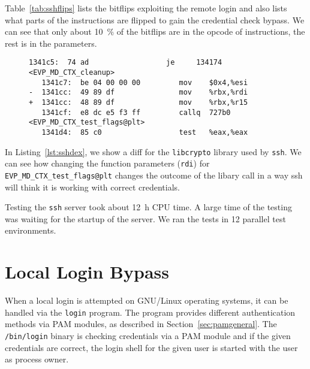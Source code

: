 Table~\ref{tab:sshflips} lists the bitflips exploiting the remote login and also
lists what parts of the instructions are flipped to gain the credential check
bypass. We can see that only about \SI{10}{\percent} of the bitflips are in the
opcode of instructions, the rest is in the parameters.

\begin{figure}
\begin{minipage}{\linewidth}
\begin{lstlisting}[style=diff,
                   caption={Diff for a bitflip applied to the
\texttt{libcrypto.so.1.0.2} binary in order to bypass a credential check. The
move from \texttt{rbx} to \texttt{rdi} is exchanged with a move to
\texttt{r15}, this changes the parameter for \texttt{EVP\_MD\_CTX\_test\_flags},
which is highly likely to result in a different outcome.},
label=lst:sshdex]
   1341c5:  74 ad                  je     134174 <EVP_MD_CTX_cleanup>
   1341c7:  be 04 00 00 00         mov    $0x4,%esi
-  1341cc:  49 89 df               mov    %rbx,%rdi
+  1341cc:  48 89 df               mov    %rbx,%r15
   1341cf:  e8 dc e5 f3 ff         callq  727b0 <EVP_MD_CTX_test_flags@plt>
   1341d4:  85 c0                  test   %eax,%eax
\end{lstlisting}
\end{minipage}
\end{figure}

In Listing~\ref{lst:sshdex}, we show a diff for the \texttt{libcrypto} library
used by \texttt{ssh}. We can see how changing the function parameters
(\texttt{rdi}) for \texttt{EVP\_MD\_CTX\_test\_flags@plt} changes the outcome of
the libary call in a way ssh will think it is working with correct credentials.

Testing the \texttt{ssh} server took about \SI{12}{\hour} CPU time. A large time
of the testing was waiting for the startup of the server.  We ran the tests in
\num{12} parallel test environments.

\section{Local Login Bypass}

When a local login is attempted on GNU/Linux operating systems, it can be
handled via the \texttt{login} program. The program provides different
authentication methods via PAM modules, as described in
Section~\ref{sec:pamgeneral}. The \texttt{/bin/login} binary is checking
credentials via a PAM module and if the given credentials are correct, the login
shell for the given user is started with the user as process owner.

